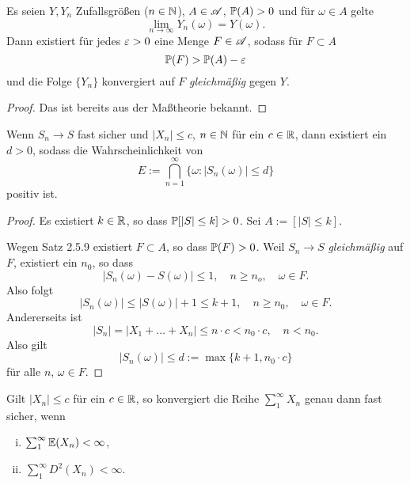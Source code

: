 \begin{thm}[Jegorow]
  Es seien $Y, Y_n$ Zufallsgrößen ($n \in \mathbb{N}$), $A \in \mathscr{A}$, $\mathbb{P}(A) > 0$ und
  für $\omega \in A$ gelte
  \[ \lim_{n \to \infty} Y_n(\omega) = Y(\omega). \]
  Dann existiert für jedes $\varepsilon > 0$ eine Menge $F \in \mathscr{A}$, sodass für $F
  \subset A$
  \[ \mathbb{P}(F) > \mathbb{P}(A) - \varepsilon \]
  und die Folge $\{Y_n\}$ konvergiert auf $F$ \emph{gleichmäßig} gegen $Y$.
\end{thm}

\begin{proof}
  Das ist bereits aus der Maßtheorie bekannt.
\end{proof}

\begin{folg}
  Wenn $S_n \to S$ fast sicher und $|X_n| \le c$, $n \in \mathbb{N}$ für ein $c \in
  \mathbb{R}$, dann existiert ein $d > 0$, sodass die Wahrscheinlichkeit von
  \[ E := \bigcap_{n=1}^\infty \{ \omega : |S_n(\omega)| \le d \}\]
  positiv ist.
\end{folg}

\begin{proof}
  Es existiert $k \in \mathbb{R}$, so dass $\mathbb{P}[|S| \le k] > 0$. Sei $A := [ |S| \le
  k ]$.

  Wegen Satz 2.5.9 existiert $F \subset A$, so dass $\mathbb{P}(F) > 0$. Weil $S_n \to
  S$ \emph{gleichmäßig} auf $F$, existiert ein $n_0$, so dass
  \[ |S_n(\omega) - S(\omega)| \le 1, \quad n \ge n_o, \quad \omega \in F. \]
  Also folgt
  \[ |S_n(\omega)| \le |S(\omega)| + 1 \le k + 1, \quad n \ge n_0, \quad \omega
    \in F.\]
  Andererseits ist
  \[ |S_n| = | X_1 + \ldots + X_n| \le n \cdot c < n_0 \cdot c, \quad n <
    n_0. \]
  Also gilt
  \[ |S_n(\omega)| \le d := \max\{ k+1, n_0 \cdot c\} \]
  für alle $n$, $\omega \in F$.
\end{proof}

\begin{thm}
  Gilt $|X_n| \le c$ für ein $c \in \mathbb{R}$, so konvergiert die Reihe
  $\sum_1^\infty X_n$ genau dann fast sicher, wenn
  \begin{enumerate}[(i)]
  \item $\sum_1^\infty \mathbb{E}(X_n) < \infty$,
  \item $\sum_1^\infty D^2(X_n) < \infty$.
  \end{enumerate}
\end{thm}

